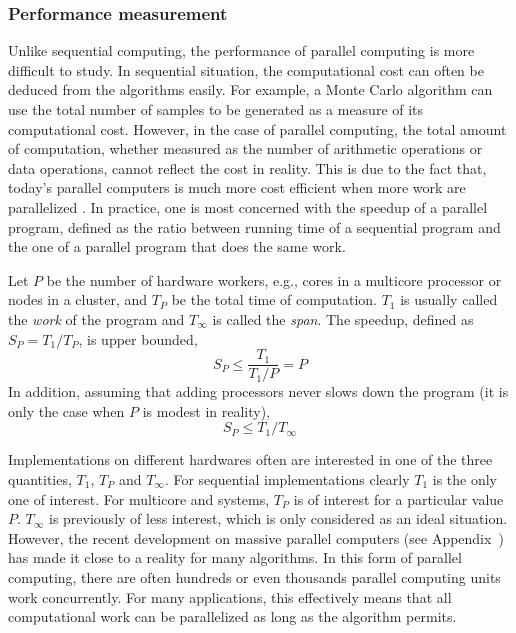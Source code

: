 \subsubsection{Performance measurement}
\label{ssub:Performance measurement}

Unlike sequential computing, the performance of parallel computing is more
difficult to study. In sequential situation, the computational cost can often
be deduced from the algorithms easily. For example, a Monte Carlo algorithm
can use the total number of samples to be generated as a measure of its
computational cost. However, in the case of parallel computing, the total
amount of computation, whether measured as the number of arithmetic operations
or data operations, cannot reflect the cost in reality. This is due to the
fact that, today's parallel computers is much more cost efficient when more
work are parallelized \cite{parallel}. In practice, one is most concerned with
the speedup of a parallel program, defined as the ratio between running time
of a sequential program and the one of a parallel program that does the same
work.

Let $P$ be the number of hardware workers, e.g., cores in a multicore
processor or nodes in a cluster, and $T_P$ be the total time of computation.
$T_1$ is usually called the \emph{work} of the program and $T_{\infty}$ is
called the \emph{span}. The speedup, defined as $S_P = T_1/T_P$, is upper
bounded,
\begin{equation}
  S_P \le \frac{T_1}{T_1/P} = P
\end{equation}
In addition, assuming that adding processors never slows down the program (it
is only the case when $P$ is modest in reality),
\begin{equation}
  S_P \le T_1/T_{\infty}
\end{equation}

Implementations on different hardwares often are interested in one of the
three quantities, $T_1$, $T_P$ and $T_{\infty}$. For sequential
implementations clearly $T_1$ is the only one of interest. For multicore and
\smp systems, $T_P$ is of interest for a particular value $P$. $T_{\infty}$ is
previously of less interest, which is only considered as an ideal situation.
However, the recent development on massive parallel computers (see
Appendix~) has made it close to a
reality for many algorithms. In this form of parallel computing, there are
often hundreds or even thousands parallel computing units work concurrently.
For many applications, this effectively means that all computational work can
be parallelized as long as the algorithm permits.

